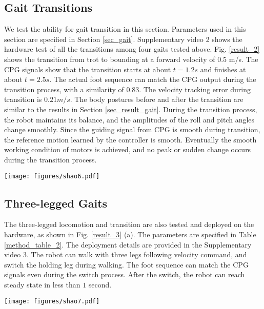 \documentclass[letterpaper, 10 pt, journal, twoside]{IEEEtran} %
\begin{document}
\subsection{Gait Transitions}
We test the ability for gait transition in this section. Parameters used in this section are specified in Section \ref{sec_gait}. Supplementary video 2 shows the hardware test of all the transitions among four gaits tested above. Fig. \ref{result_2} shows the transition from trot to bounding at a forward velocity of 0.5 m/s. The CPG signals show that the transition starts at about $t=1.2s$ and finishes at about $t=2.5s$. The actual foot sequence can match the CPG output during the transition process, with a similarity of 0.83. The velocity tracking error during transition is $0.21m/s$. The body postures before and after the transition are similar to the results in Section \ref{sec_result_gait}. During the transition process, the robot maintains its balance, and the amplitudes of the roll and pitch angles change smoothly. Since the guiding signal from CPG is smooth during transition, the reference motion learned by the controller is smooth. Eventually the smooth working condition of motors is achieved, and no peak or sudden change occurs during the transition process.
\begin{figure*}[!t]
	\centering
	\texttt{[image: figures/shao6.pdf]}
	\caption{A typical gait transition from trot to pacing. (a) The actual foot fall, CPG signals and the roll and pitch angles during the transition process. (b) The maximum speed and torque for three types of joint indicates that the transition process is smooth at joint level.}
	\label{result_2}
\end{figure*}

\subsection{Three-legged Gaits}
The three-legged locomotion and transition are also tested and deployed on the hardware, as shown in Fig. \ref{result_3} (a). The parameters are specified in Table \ref{method_table_2}. The deployment details are provided in the Supplementary video 3. The robot can walk with three legs following velocity command, and switch the holding leg during walking. The foot sequence can match the CPG signals even during the switch process. After the switch, the robot can reach steady state in less than $1$ second. 
\begin{figure*}[!t]
	\centering
	\texttt{[image: figures/shao7.pdf]}
	\caption{Examples for complex gait deployed on the hardware. (a) An example of three-legged locomotion. (b) An example of a manually designed gait in which four legs hold various periods. Each foot is found to be in the proper swing or stance phase as expected.}
	\label{result_3}
\end{figure*}
\end{document}
